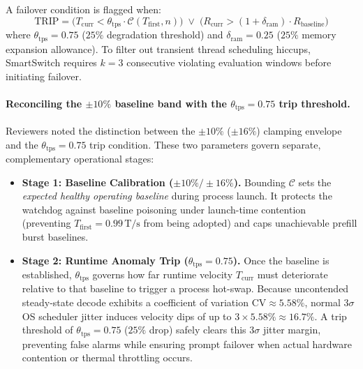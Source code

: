 \documentclass[11pt,a4paper]{article}
\newcommand{\Tfirst}{T_{\mathrm{first}}}
\newcommand{\Tcurr}{T_{\mathrm{curr}}}
\newcommand{\Cfun}{\mathcal{C}}
\newcommand{\Ts}{\,\mathrm{T/s}}
\begin{document}
A failover condition is flagged when:
\begin{equation}\label{eq:trip}
\mathrm{TRIP} = \bigl(\Tcurr < \theta_{\mathrm{tps}} \cdot \Cfun(\Tfirst, n)\bigr) \;\lor\; \bigl(R_{\mathrm{curr}} > (1+\delta_{\mathrm{ram}}) \cdot R_{\mathrm{baseline}}\bigr)
\end{equation}
where $\theta_{\mathrm{tps}} = 0.75$ ($25\%$ degradation threshold) and $\delta_{\mathrm{ram}} = 0.25$ ($25\%$ memory expansion allowance). To filter out transient thread scheduling hiccups, SmartSwitch requires $k=3$ consecutive violating evaluation windows before initiating failover.

\paragraph{Reconciling the $\pm10\%$ baseline band with the $\theta_{\mathrm{tps}} = 0.75$ trip threshold.}
Reviewers noted the distinction between the $\pm10\%$ ($\pm16\%$) clamping envelope and the $\theta_{\mathrm{tps}} = 0.75$ trip condition. These two parameters govern separate, complementary operational stages:
\begin{itemize}[leftmargin=*]
  \item \textbf{Stage 1: Baseline Calibration ($\pm10\% / \pm16\%$).} Bounding $\Cfun$ sets the \emph{expected healthy operating baseline} during process launch. It protects the watchdog against baseline poisoning under launch-time contention (preventing $\Tfirst = 0.99\Ts$ from being adopted) and caps unachievable prefill burst baselines.
  \item \textbf{Stage 2: Runtime Anomaly Trip ($\theta_{\mathrm{tps}} = 0.75$).} Once the baseline is established, $\theta_{\mathrm{tps}}$ governs how far runtime velocity $\Tcurr$ must deteriorate relative to that baseline to trigger a process hot-swap. Because uncontended steady-state decode exhibits a coefficient of variation $\mathrm{CV} \approx 5.58\%$, normal $3\sigma$ OS scheduler jitter induces velocity dips of up to $3 \times 5.58\% \approx 16.7\%$. A trip threshold of $\theta_{\mathrm{tps}} = 0.75$ ($25\%$ drop) safely clears this $3\sigma$ jitter margin, preventing false alarms while ensuring prompt failover when actual hardware contention or thermal throttling occurs.
\end{itemize}
\end{document}
